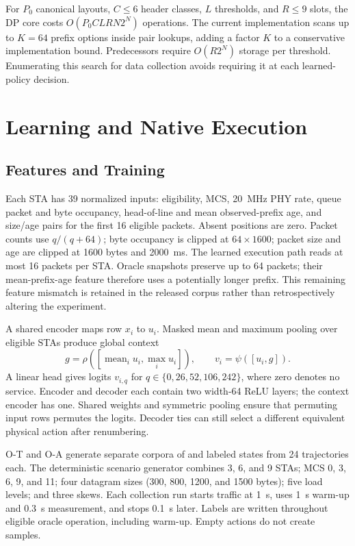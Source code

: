 \documentclass[10pt,journal,onecolumn]{IEEEtran}
\begin{document}
For $P_0$ canonical layouts, $C\leq6$ header classes, $L$ thresholds, and
$R\leq9$ slots, the DP core costs $O(P_0CLR N2^N)$ operations. The current
implementation scans up to $K=64$ prefix options inside pair lookups,
adding a factor $K$ to a conservative implementation bound. Predecessors
require $O(R2^N)$ storage per threshold. Enumerating this search for data
collection avoids requiring it at each learned-policy decision.

\section{Learning and Native Execution}
\subsection{Features and Training}
Each STA has 39 normalized inputs: eligibility, MCS, 20~MHz PHY rate, queue
packet and byte occupancy, head-of-line and mean observed-prefix age, and
size/age pairs for the first 16 eligible packets. Absent positions are zero.
Packet counts use $q/(q+64)$; byte occupancy is clipped at $64\times1600$;
packet size and age are clipped at 1600 bytes and 2000~ms. The learned
execution path reads at most 16 packets per STA. Oracle snapshots preserve
up to 64 packets; their mean-prefix-age feature therefore uses a potentially
longer prefix. This remaining feature mismatch is retained in the released
corpus rather than retrospectively altering the experiment.

A shared encoder maps row $x_i$ to $u_i$. Masked mean and maximum pooling
over eligible STAs produce global context
\begin{equation}
 g=\rho\left(\left[\operatorname{mean}_i u_i,
                           \operatorname{max}_i u_i\right]\right),\qquad
 v_i=\psi([u_i,g]).
\end{equation}
A linear head gives logits $v_{i,q}$ for
$q\in\{0,26,52,106,242\}$, where zero denotes no service. Encoder and
decoder each contain two width-64 ReLU layers; the context encoder has one.
Shared weights and symmetric pooling ensure that permuting input rows
permutes the logits. Decoder ties can still select a different equivalent
physical action after renumbering.

O-T and O-A generate separate corpora of \TRows{} and \ARows{} labeled
states from 24 trajectories each. The deterministic scenario generator
combines 3, 6, and 9 STAs; MCS 0, 3, 6, 9, and 11; four datagram sizes
(300, 800, 1200, and 1500 bytes); five load levels; and three skews.
Each collection run starts traffic at 1~s, uses 1~s warm-up and 0.3~s
measurement, and stops 0.1~s later. Labels are written throughout eligible
oracle operation, including warm-up. Empty actions do not create samples.
\end{document}
